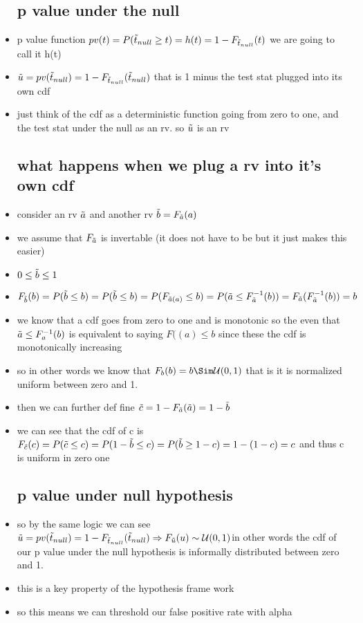 \documentclass{article}
\begin{document}
\begin{itemize}
\subsection{p value under the null}
\item p value function $pv(t)=P(\Tilde{t}_{null}\geq t)=h(t)=1-F_{\Tilde{t}_{null}}(t)$ we are going to call it h(t)
\item $\Tilde{u}=pv(\Tilde{t}_{null})=1-F_{\Tilde{t}_{null}}(\Tilde{t}_{null})$ that is 1 minus the test stat plugged into its own cdf
\item just think of the cdf as a deterministic function going from zero to one, and the test stat under the null as an rv. so $\Tilde{u}$ is an rv
\subsection{what happens when we plug a rv into it's own cdf}
\item consider an rv $\Tilde{a}$ and another rv $\Tilde{b}=F_{\Tilde{a}}(a)$
\item we assume that $F_{\Tilde{a}}$ is invertable (it does not have to be but it just makes this easier) 
\item $0\leq \Tilde{b}\leq 1$ 
\item $ F_{\Tilde{b}}(b)=P(\Tilde{b}\leq b)=P(\Tilde{b}\leq b)=P(F_{\Tilde{a}(a)}\leq b)=P(\Tilde{a}\leq F^{-1}_{\Tilde{a}}(b))=F_{\Tilde{a}}(F_{\Tilde{a}}^{-1}(b))=b$
\item we know that a cdf goes from zero to one and is monotonic so the even that $\Tilde{a}\leq F^{-1}_{a}(b)$ is equivalent to saying $F((a)\leq b$ since these the cdf is monotonically increasing
\item so in other words we know that $F_{b}(b)=b\Sim\mathcal{U}(0,1)$ that is it is normalized uniform between zero and 1. 
\item then we can further def fine $\Tilde{c}=1-F_{\Tilde{a}}(\Tilde{a})=1-\Tilde{b}$
\item we can see that the cdf of c is $F_{\Tilde{c}}(c)=P(\Tilde{c}\leq c)=P(1-\Tilde{b}\leq c)=P(\Tilde{b}\geq 1-c)=1-(1-c)=c$ and thus c is uniform in zero one 
\subsection{p value under null hypothesis }
\item so by the same logic we can see $\Tilde{u}=pv(\Tilde{t}_{null})=1-F_{\Tilde{t}_{null}}(\Tilde{t}_{null})\Rightarrow F_{\Tilde{u}}(u)\sim \mathcal{U}(0,1)$in other words the cdf of our p value under the null hypothesis is informally distributed between zero and 1. 
\item this is a key property of the hypothesis frame work 
\item so this means we can threshold our false positive rate with alpha 

\end{itemize}
\end{document}
